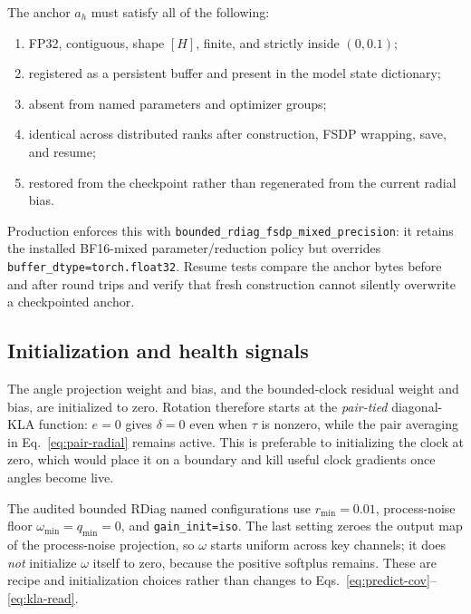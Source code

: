 \documentclass[11pt]{article}
\begin{document}
The anchor $a_h$ must satisfy all of the following:
\begin{enumerate}[leftmargin=1.8em]
  \item FP32, contiguous, shape $[H]$, finite, and strictly inside $(0,0.1)$;
  \item registered as a persistent buffer and present in the model state dictionary;
  \item absent from named parameters and optimizer groups;
  \item identical across distributed ranks after construction, FSDP wrapping, save, and resume;
  \item restored from the checkpoint rather than regenerated from the current radial bias.
\end{enumerate}
Production enforces this with \texttt{bounded\_rdiag\_fsdp\_mixed\_precision}: it retains the
installed BF16-mixed parameter/reduction policy but overrides
\texttt{buffer\_dtype=torch.float32}.  Resume tests compare the anchor bytes before and after round
trips and verify that fresh construction cannot silently overwrite a checkpointed anchor.

\subsection{Initialization and health signals}

The angle projection weight and bias, and the bounded-clock residual weight and bias, are initialized
to zero.  Rotation therefore starts at the \emph{pair-tied} diagonal-KLA function: $e=0$ gives
$\delta=0$ even when $\tau$ is nonzero, while the pair averaging in Eq.~\eqref{eq:pair-radial}
remains active.  This is preferable to initializing the clock at zero, which would place it on a
boundary and kill useful clock gradients once angles become live.

The audited bounded RDiag named configurations use $r_{\min}=0.01$, process-noise floor
$\omega_{\min}=q_{\min}=0$, and \texttt{gain\_init=iso}.  The last setting zeroes the output map of
the process-noise projection, so $\omega$ starts uniform across key channels; it does \emph{not}
initialize $\omega$ itself to zero, because the positive softplus remains.  These are recipe and
initialization choices rather than changes to Eqs.~\eqref{eq:predict-cov}--\eqref{eq:kla-read}.
\end{document}

